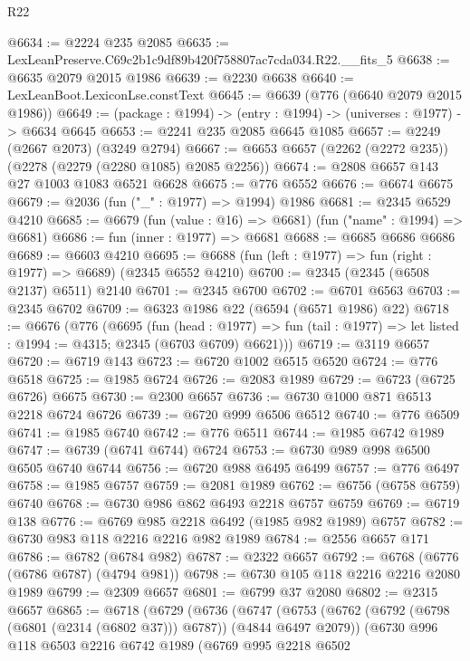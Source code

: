 \begin{lexlean}{R22}
\begin{coremodule}
@6634 := @2224 @235 @2085
@6635 := LexLeanPreserve.C69c2b1c9df89b420f758807ac7cda034.R22.__fits_5
@6638 := @6635 @2079 @2015 @1986
@6639 := @2230 @6638
@6640 := LexLeanBoot.LexiconLse.constText
@6645 := @6639 (@776 (@6640 @2079 @2015 @1986))
@6649 := (package : @1994) -> (entry : @1994) -> (universes : @1977) -> @6634 @6645
@6653 := @2241 @235 @2085 @6645 @1085
@6657 := @2249 (@2667 @2073) (@3249 @2794)
@6667 := @6653 @6657 (@2262 (@2272 @235)) (@2278 (@2279 (@2280 @1085) @2085 @2256))
@6674 := @2808 @6657 @143 @27 @1003 @1083 @6521 @6628
@6675 := @776 @6552
@6676 := @6674 @6675
@6679 := @2036 (fun ("_" : @1977) => @1994) @1986
@6681 := @2345 @6529 @4210
@6685 := @6679 (fun (value : @16) => @6681) (fun ("name" : @1994) => @6681)
@6686 := fun (inner : @1977) => @6681
@6688 := @6685 @6686 @6686
@6689 := @6603 @4210
@6695 := @6688 (fun (left : @1977) => fun (right : @1977) => @6689) (@2345 @6552 @4210)
@6700 := @2345 (@2345 (@6508 @2137) @6511) @2140
@6701 := @2345 @6700
@6702 := @6701 @6563
@6703 := @2345 @6702
@6709 := @6323 @1986 @22 (@6594 (@6571 @1986) @22)
@6718 := @6676
    (@776
      (@6695
        (fun (head : @1977) =>
        fun (tail : @1977) => let listed : @1994 := @4315; @2345 (@6703 @6709) @6621)))
@6719 := @3119 @6657
@6720 := @6719 @143
@6723 := @6720 @1002 @6515 @6520
@6724 := @776 @6518
@6725 := @1985 @6724
@6726 := @2083 @1989
@6729 := @6723 (@6725 @6726) @6675
@6730 := @2300 @6657
@6736 := @6730 @1000 @871 @6513 @2218 @6724 @6726
@6739 := @6720 @999 @6506 @6512
@6740 := @776 @6509
@6741 := @1985 @6740
@6742 := @776 @6511
@6744 := @1985 @6742 @1989
@6747 := @6739 (@6741 @6744) @6724
@6753 := @6730 @989 @998 @6500 @6505 @6740 @6744
@6756 := @6720 @988 @6495 @6499
@6757 := @776 @6497
@6758 := @1985 @6757
@6759 := @2081 @1989
@6762 := @6756 (@6758 @6759) @6740
@6768 := @6730 @986 @862 @6493 @2218 @6757 @6759
@6769 := @6719 @138
@6776 := @6769 @985 @2218 @6492 (@1985 @982 @1989) @6757
@6782 := @6730 @983 @118 @2216 @2216 @982 @1989
@6784 := @2556 @6657 @171
@6786 := @6782 (@6784 @982)
@6787 := @2322 @6657
@6792 := @6768 (@6776 (@6786 @6787) (@4794 @981))
@6798 := @6730 @105 @118 @2216 @2216 @2080 @1989
@6799 := @2309 @6657
@6801 := @6799 @37 @2080
@6802 := @2315 @6657
@6865 := @6718
    (@6729
      (@6736
        (@6747
          (@6753
            (@6762 (@6792 (@6798 (@6801 (@2314 (@6802 @37))) @6787)) (@4844 @6497 @2079))
            (@6730
              @996
              @118
              @6503
              @2216
              @6742
              @1989
              (@6769
                @995
                @2218
                @6502

\end{coremodule}
\end{lexlean}

